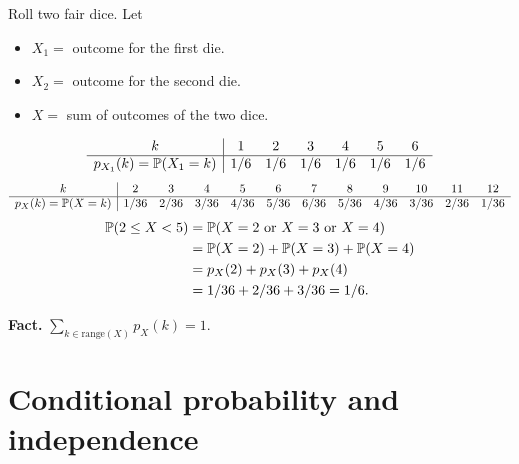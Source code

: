  \begin{example}
    Roll two fair dice. Let
    \begin{itemize}
    \item $X_1 =$ outcome for the first die.
    \item $X_2 =$ outcome for the second die.
    \item $X = $ sum of outcomes of the two dice.
    \end{itemize}
    \[
      \begin{array}{c|cccccc}
       k & 1  & 2 & 3 & 4 & 5 &  6\\
        \hline
       p_{X_1}(k) = \mathbb{P}(X_1 = k) & 1/6 & 1/6 & 1/6 & 1/6 & 1/6 & 1/6 \\
      \end{array}
    \]
    \[
      \begin{array}
        {c|cccccccccccc}
        k & 2 & 3 & 4 & 5 & 6 & 7 & 8 & 9 & 10 & 11 & 12\\
        \hline
        p_X(k) = \mathbb{P}(X = k) & 1/36 & 2/36 & 3/36 & 4/36 & 5/36 & 6/36 & 5/36 &
                                                                               4/36
                                          & 3/36 & 2/36 & 1/36 
      \end{array}
    \]
    \begin{align*}
      \mathbb{P}(2\le X < 5) & = \mathbb{P}(X = 2~\text{or}~ X=3~\text{or}~ X=4)\\
                      & = \mathbb{P}(X = 2) + \mathbb{P}(X = 3) + \mathbb{P}(X = 4)\\
                      & = p_X(2) + p_X(3) + p_X(4)\\
                      & = 1/36 + 2/36 + 3/36 = 1/6.
    \end{align*}
  \end{example}
  \textbf{Fact.} $\sum_{k\in \text{range}(X)}p_X(k) = 1$.

  \section{Conditional probability and independence}
\label{sec:cond-prob-indep}
